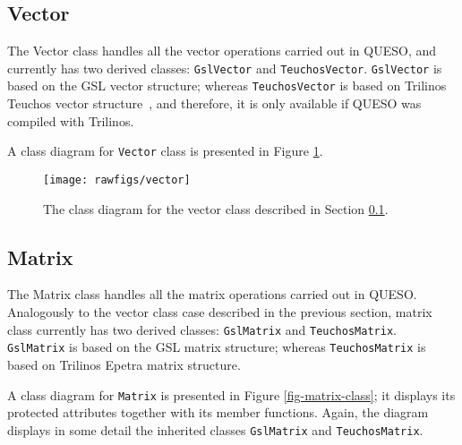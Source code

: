 \subsection{Vector}\label{sec:vector_class}


The Vector class handles all the vector operations carried out in QUESO, and currently has two derived classes: \verb+GslVector+ and \verb+TeuchosVector+. \verb+GslVector+ is based on the GSL vector structure; whereas \verb+TeuchosVector+ is based on Trilinos Teuchos vector structure~\cite{Trilinos}, and therefore, it is only available if QUESO was compiled with Trilinos.

A class diagram for \verb+Vector+ class is presented in Figure \ref{fig-vector-class}.%


\begin{figure}[!htpb]
\centering
\vspace*{-.5cm}
\texttt{[image: rawfigs/vector]}
\vspace*{-.8cm}
\caption{ The class diagram for the vector class described in Section \ref{sec:vector_class}.}
\label{fig-vector-class}
\end{figure}



\subsection{Matrix}\label{sec:matrix_class}



The Matrix class handles all the matrix operations carried out in QUESO.  Analogously to the vector class case described in the previous section,
matrix class currently has two derived classes: \verb+GslMatrix+ and \verb+TeuchosMatrix+. \verb+GslMatrix+ is based on the GSL matrix structure; whereas \verb+TeuchosMatrix+ is based on Trilinos Epetra matrix structure.

A class diagram for \verb+Matrix+  is presented in Figure \ref{fig-matrix-class}; it displays its protected attributes together with its member functions. Again, the diagram displays in some detail the inherited classes \verb+GslMatrix+ and \verb+TeuchosMatrix+.


